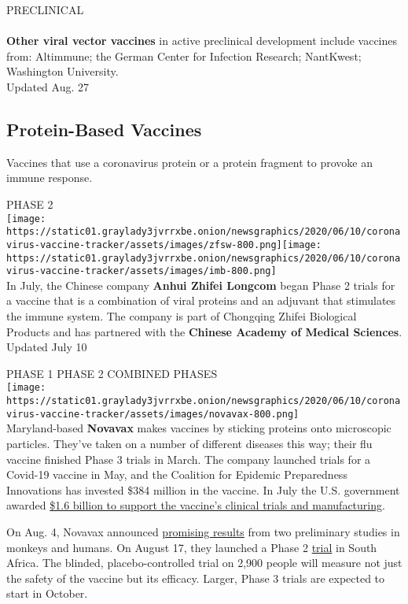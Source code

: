 PRECLINICAL\\
~\\
 \textbf{Other viral vector vaccines} in active preclinical development
include vaccines from: Altimmune; the German Center for Infection
Research; NantKwest; Washington University.\\
Updated Aug. 27

\hypertarget{protein-based-vaccines}{%
\subsection{Protein-Based Vaccines}\label{protein-based-vaccines}}

Vaccines that use a coronavirus protein or a protein fragment to provoke
an immune response.

PHASE 2\\
\texttt{[image: https://static01.graylady3jvrrxbe.onion/newsgraphics/2020/06/10/coronavirus-vaccine-tracker/assets/images/zfsw-800.png]}\texttt{[image: https://static01.graylady3jvrrxbe.onion/newsgraphics/2020/06/10/coronavirus-vaccine-tracker/assets/images/imb-800.png]}\\
In July, the Chinese company \textbf{Anhui Zhifei Longcom} began Phase 2
trials for a vaccine that is a combination of viral proteins and an
adjuvant that stimulates the immune system. The company is part of
Chongqing Zhifei Biological Products and has partnered with the
\textbf{Chinese Academy of Medical Sciences}.\\
Updated July 10

PHASE 1 PHASE 2 COMBINED PHASES\\
\texttt{[image: https://static01.graylady3jvrrxbe.onion/newsgraphics/2020/06/10/coronavirus-vaccine-tracker/assets/images/novavax-800.png]}\\
Maryland-based \textbf{Novavax} makes vaccines by sticking proteins onto
microscopic particles. They've taken on a number of different diseases
this way; their flu vaccine finished Phase 3 trials in March. The
company launched trials for a Covid-19 vaccine in May, and the Coalition
for Epidemic Preparedness Innovations has invested \$384 million in the
vaccine. In July the U.S. government awarded
\href{https://www.nytimes3xbfgragh.onion/2020/07/07/health/novavax-coronavirus-vaccine-warp-speed.html}{\$1.6
billion to support the vaccine's clinical trials and manufacturing}.

On Aug. 4, Novavax announced
\href{https://www.nytimes3xbfgragh.onion/2020/08/04/health/covid-19-vaccine-novavax.html}{promising
results} from two preliminary studies in monkeys and humans. On August
17, they launched a Phase 2
\href{https://clinicaltrials.gov/ct2/show/NCT04533399}{trial} in South
Africa. The blinded, placebo-controlled trial on 2,900 people will
measure not just the safety of the vaccine but its efficacy. Larger,
Phase 3 trials are expected to start in October.

